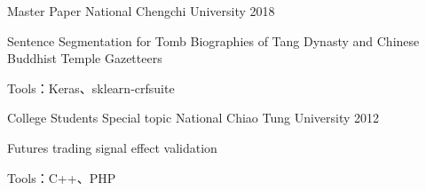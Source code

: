 

\begin{cventries}
  \cventry
    {Master} %
    {Paper} %
    {National Chengchi University} %
    {2018} %
    {
      \begin{cvitems} %
        \item {Sentence Segmentation for Tomb Biographies of Tang Dynasty and Chinese Buddhist Temple Gazetteers}
        \item {Tools：Keras、sklearn-crfsuite}
      \end{cvitems}
    }

  \cventry
    {College Students} %
    {Special topic} %
    {National Chiao Tung University} %
    {2012} %
    {
      \begin{cvitems} %
      \item {Futures trading signal effect validation}
        \item {Tools：C++、PHP}
      \end{cvitems}
    }

\end{cventries}

